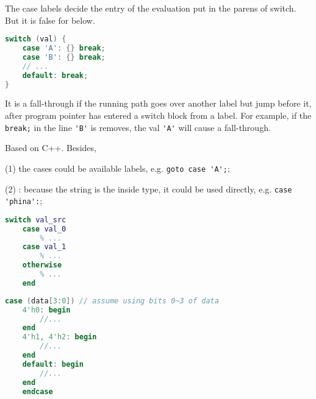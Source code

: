 
The case labels decide the entry of the evaluation put in the parens of switch. But it is false for below.

\begin{lstlisting}[language=C]
switch (val) {
	case 'A': {} break;
	case 'B': {} break;
	// ...
	default: break;
}
\end{lstlisting}


It is a fall-through if the running path goes over another label but jump before it, after program pointer has entered a switch block from a label.
For example, if the \verb|break;| in the line \verb|'B'| is removes, the val \verb|'A'| will cause a fall-through.


Based on C++.
Besides,

(1) the cases could be available labels, e.g. \verb`goto case 'A';`;

(2) : because the string is the inside type, it could be used directly, e.g. \verb`case 'phina':`;

\begin{lstlisting}[language=MATLAB]
	switch val_src
	case val_0
		% ...
	case val_1
		% ...
	otherwise
		% ...
	end
\end{lstlisting}


\begin{lstlisting}[language=Verilog]
	case (data[3:0]) // assume using bits 0~3 of data
	4'h0: begin
		//...
	end
	4'h1, 4'h2: begin
		//...
	end
	default: begin
		//...
	end
	endcase
\end{lstlisting}



